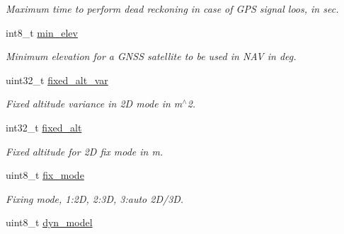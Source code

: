 \begin{DoxyCompactItemize}
\begin{DoxyCompactList}\small\item\em Maximum time to perform dead reckoning in case of G\+P\+S signal loos, in sec. \end{DoxyCompactList}\item 
\hypertarget{structubx__cfg__nav__settings__t_a833852b707eef152b4043b78a804bbb3}{int8\+\_\+t \hyperlink{structubx__cfg__nav__settings__t_a833852b707eef152b4043b78a804bbb3}{min\+\_\+elev}}\label{structubx__cfg__nav__settings__t_a833852b707eef152b4043b78a804bbb3}

\begin{DoxyCompactList}\small\item\em Minimum elevation for a G\+N\+S\+S satellite to be used in N\+A\+V in deg. \end{DoxyCompactList}\item 
\hypertarget{structubx__cfg__nav__settings__t_affd95a1591aceaf114099066d449c8d6}{uint32\+\_\+t \hyperlink{structubx__cfg__nav__settings__t_affd95a1591aceaf114099066d449c8d6}{fixed\+\_\+alt\+\_\+var}}\label{structubx__cfg__nav__settings__t_affd95a1591aceaf114099066d449c8d6}

\begin{DoxyCompactList}\small\item\em Fixed altitude variance in 2\+D mode in m$^\wedge$2. \end{DoxyCompactList}\item 
\hypertarget{structubx__cfg__nav__settings__t_abf398db1ebbbfcc554b4913fad589108}{int32\+\_\+t \hyperlink{structubx__cfg__nav__settings__t_abf398db1ebbbfcc554b4913fad589108}{fixed\+\_\+alt}}\label{structubx__cfg__nav__settings__t_abf398db1ebbbfcc554b4913fad589108}

\begin{DoxyCompactList}\small\item\em Fixed altitude for 2\+D fix mode in m. \end{DoxyCompactList}\item 
\hypertarget{structubx__cfg__nav__settings__t_a685698a1e6da7241a7a5cbbd98bdd3b2}{uint8\+\_\+t \hyperlink{structubx__cfg__nav__settings__t_a685698a1e6da7241a7a5cbbd98bdd3b2}{fix\+\_\+mode}}\label{structubx__cfg__nav__settings__t_a685698a1e6da7241a7a5cbbd98bdd3b2}

\begin{DoxyCompactList}\small\item\em Fixing mode, 1\+:2\+D, 2\+:3\+D, 3\+:auto 2\+D/3\+D. \end{DoxyCompactList}\item 
\hypertarget{structubx__cfg__nav__settings__t_a1f977a007dd8fdd10a957fa52f9f2712}{uint8\+\_\+t \hyperlink{structubx__cfg__nav__settings__t_a1f977a007dd8fdd10a957fa52f9f2712}{dyn\+\_\+model}}\label{structubx__cfg__nav__settings__t_a1f977a007dd8fdd10a957fa52f9f2712}


\end{DoxyCompactItemize}
